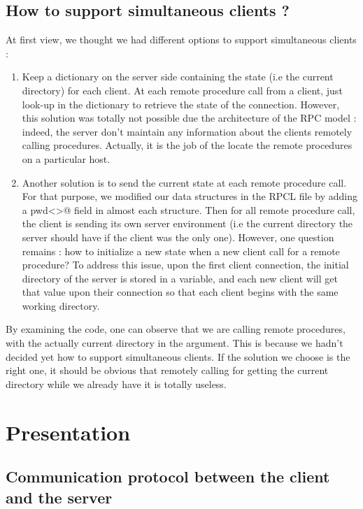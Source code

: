 \documentclass{article}
\begin{document}
\subsection{How to support simultaneous clients ?}
At first view, we thought we had different options to support simultaneous clients :
\begin{enumerate}
\item Keep a dictionary on the server side containing the state (i.e the current directory) for each client. At each remote procedure call from a client, just look-up in the dictionary to retrieve the state of the connection. However, this solution was totally not possible due the architecture of the RPC model : indeed, the server don't maintain any information about the clients remotely calling procedures. Actually, it is the job of the \verb@PortMapper@ locate the remote procedures on a particular host.
\item Another solution is to send the current state at each remote procedure call. For that purpose, we modified our data structures in the RPCL file by adding a \verb@string pwd<>@ field in almost each structure. Then for all remote procedure call, the client is sending its own server environment (i.e the current directory the server should have if the client was the only one). However, one question remains : how to initialize a new state when a new client call for a remote procedure? To address this issue, upon the first client connection, the initial directory of the server is stored in a variable, and each new client will get that value upon their connection so that each client begins with the same working directory.
\end{enumerate}
By examining the code, one can observe that we are calling \verb@PWD@ remote procedures, with the actually current directory in the argument. This is because we hadn't decided yet how to support simultaneous clients. If the solution we choose is the right one, it should be obvious that remotely calling for getting the current directory while we already have it is totally useless.

\section{Presentation}
\subsection{Communication protocol between the client and the server}
\end{document}
